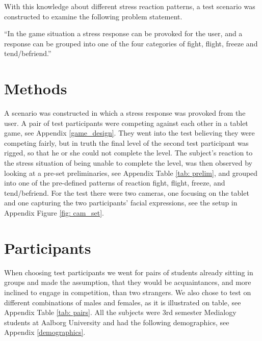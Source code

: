 With this knowledge about different stress reaction patterns, a test scenario was constructed to examine the following problem statement.

“In the game situation a stress response can be provoked for the user, and a response can be grouped into one of the four categories of fight, flight, freeze and tend/befriend.”

\section{Methods}
A scenario was constructed in which a stress response was provoked from the user. A pair of test participants were competing against each other in a tablet game, see Appendix \ref{game_design}. They went into the test believing they were competing fairly, but in truth the final level of the second test participant was rigged, so that he or she could not complete the level. The subject's reaction to the stress situation of being unable to complete the level, was then observed by looking at a pre-set preliminaries, see Appendix Table \ref{tab: prelim}, and grouped into one of the pre-defined patterns of reaction fight, flight, freeze, and tend/befriend. For the test there were two cameras, one focusing on the tablet and one capturing the two participants' facial expressions, see the setup in Appendix Figure \ref{fig: cam_set}. 

\section{Participants}
When choosing test participants we went for pairs of students already sitting in groups and made the assumption, that they would be acquaintances, and more inclined to engage in competition, than two strangers. We also chose to test on different combinations of males and females, as it is illustrated on table, see Appendix Table \ref{tab: pairs}. All the subjects were 3rd semester Medialogy students at Aalborg University and had the following demographics, see Appendix \ref{demographics}. 


